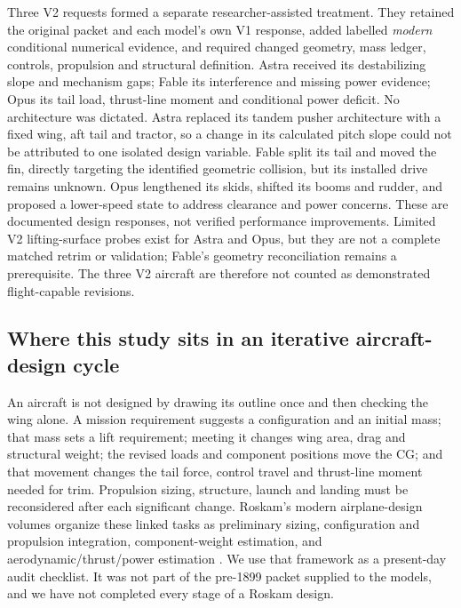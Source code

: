 \documentclass[11pt,a4paper]{article}
\begin{document}
Three V2 requests formed a separate researcher-assisted treatment. They retained the original packet and each model's own V1 response, added labelled \emph{modern} conditional numerical evidence, and required changed geometry, mass ledger, controls, propulsion and structural definition. Astra received its destabilizing slope and mechanism gaps; Fable its interference and missing power evidence; Opus its tail load, thrust-line moment and conditional power deficit. No architecture was dictated. Astra replaced its tandem pusher architecture with a fixed wing, aft tail and tractor, so a change in its calculated pitch slope could not be attributed to one isolated design variable. Fable split its tail and moved the fin, directly targeting the identified geometric collision, but its installed drive remains unknown. Opus lengthened its skids, shifted its booms and rudder, and proposed a lower-speed state to address clearance and power concerns. These are documented design responses, not verified performance improvements. Limited V2 lifting-surface probes exist for Astra and Opus, but they are not a complete matched retrim or validation; Fable's geometry reconciliation remains a prerequisite. The three V2 aircraft are therefore not counted as demonstrated flight-capable revisions.

\subsection{Where this study sits in an iterative aircraft-design cycle}
An aircraft is not designed by drawing its outline once and then checking the wing alone. A mission requirement suggests a configuration and an initial mass; that mass sets a lift requirement; meeting it changes wing area, drag and structural weight; the revised loads and component positions move the CG; and that movement changes the tail force, control travel and thrust-line moment needed for trim. Propulsion sizing, structure, launch and landing must be reconsidered after each significant change. Roskam's modern airplane-design volumes organize these linked tasks as preliminary sizing, configuration and propulsion integration, component-weight estimation, and aerodynamic/thrust/power estimation \cite{ref36,ref37,ref38,ref39}. We use that framework as a present-day audit checklist. It was not part of the pre-1899 packet supplied to the models, and we have not completed every stage of a Roskam design.
\end{document}
